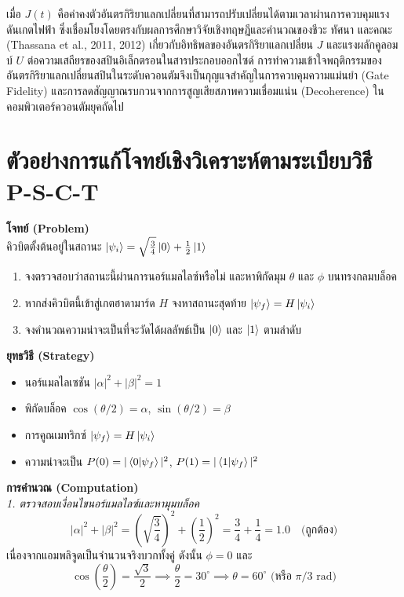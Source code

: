 เมื่อ $J(t)$ คือค่าคงตัวอันตรกิริยาแลกเปลี่ยนที่สามารถปรับเปลี่ยนได้ตามเวลาผ่านการควบคุมแรงดันเกตไฟฟ้า ซึ่งเชื่อมโยงโดยตรงกับผลการศึกษาวิจัยเชิงทฤษฎีและคำนวณของชีวะ ทัศนา และคณะ (Thassana et al., 2011, 2012) เกี่ยวกับอิทธิพลของอันตรกิริยาแลกเปลี่ยน $J$ และแรงผลักคูลอมบ์ $U$ ต่อความเสถียรของสปินอิเล็กตรอนในสารประกอบออกไซด์ การทำความเข้าใจพฤติกรรมของอันตรกิริยาแลกเปลี่ยนสปินในระดับควอนตัมจึงเป็นกุญแจสำคัญในการควบคุมความแม่นยำ (Gate Fidelity) และการลดสัญญาณรบกวนจากการสูญเสียสภาพความเชื่อมแน่น (Decoherence) ในคอมพิวเตอร์ควอนตัมยุคถัดไป

\section{ตัวอย่างการแก้โจทย์เชิงวิเคราะห์ตามระเบียบวิธี P-S-C-T}

\begin{psctexample}
\textbf{โจทย์ (Problem)} \\
คิวบิตตั้งต้นอยู่ในสถานะ $\ket{\psi_i} = \sqrt{\frac{3}{4}}\ket{0} + \frac{1}{2}\ket{1}$ 
\begin{enumerate}
    \item จงตรวจสอบว่าสถานะนี้ผ่านการนอร์แมลไลซ์หรือไม่ และหาพิกัดมุม $\theta$ และ $\phi$ บนทรงกลมบล็อค
    \item หากส่งคิวบิตนี้เข้าสู่เกตฮาดามาร์ด $H$ จงหาสถานะสุดท้าย $\ket{\psi_f} = H\ket{\psi_i}$
    \item จงคำนวณความน่าจะเป็นที่จะวัดได้ผลลัพธ์เป็น $\ket{0}$ และ $\ket{1}$ ตามลำดับ
\end{enumerate}

\textbf{ยุทธวิธี (Strategy)} \\
\begin{itemize}
    \item นอร์แมลไลเซชัน $|\alpha|^2 + |\beta|^2 = 1$
    \item พิกัดบล็อค $\cos(\theta/2) = \alpha$, $\sin(\theta/2) = \beta$
    \item การคูณเมทริกซ์ $\ket{\psi_f} = H \ket{\psi_i}$
    \item ความน่าจะเป็น $P(0) = |\braket{0}{\psi_f}|^2$, $P(1) = |\braket{1}{\psi_f}|^2$
\end{itemize}

\textbf{การคำนวณ (Computation)} \\
\textit{1. ตรวจสอบเงื่อนไขนอร์แมลไลซ์และหามุมบล็อค}
\begin{equation}
|\alpha|^2 + |\beta|^2 = \left(\sqrt{\frac{3}{4}}\right)^2 + \left(\frac{1}{2}\right)^2 = \frac{3}{4} + \frac{1}{4} = 1.0 \quad \text{(ถูกต้อง)}
\end{equation}
เนื่องจากแอมพลิจูดเป็นจำนวนจริงบวกทั้งคู่ ดังนั้น $\phi = 0$ และ
\begin{equation}
\cos\left(\frac{\theta}{2}\right) = \frac{\sqrt{3}}{2} \implies \frac{\theta}{2} = 30^\circ \implies \theta = 60^\circ \text{ (หรือ } \pi/3 \text{ rad)}
\end{equation}


\end{psctexample}
